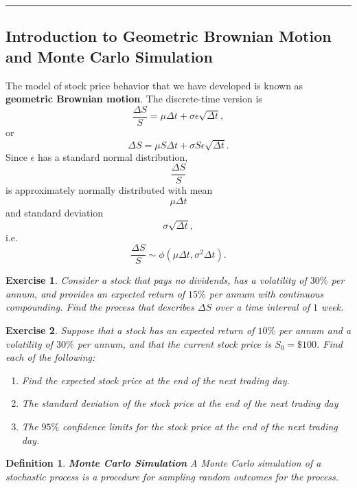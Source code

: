 \documentclass[letterpaper,10pt]{article}
\newtheorem{df}{Definition}[section]
\newtheorem{ex}{Exercise}
\begin{document}
\bigskip

\hrule

\bigskip

\subsection{Introduction to Geometric Brownian Motion and Monte Carlo Simulation}

\noindent The model of stock price behavior that we have developed is known as {\bf geometric Brownian motion}.  The discrete-time version is $$\frac{\Delta S}{S}=\mu\Delta t+\sigma\epsilon\sqrt{\Delta t},$$ or $$\Delta S=\mu S\Delta t+\sigma S\epsilon\sqrt{\Delta t}.$$  Since $\epsilon$ has a standard normal distribution, $$\frac{\Delta S}{S}$$ is approximately normally distributed with mean $$\mu\Delta t$$ and standard deviation $$\sigma\sqrt{\Delta t},$$ i.e. $$\frac{\Delta S}{S}\sim\phi(\mu\Delta t,\sigma^2\Delta t).$$



\begin{ex}
Consider a stock that pays no dividends, has a volatility of $30\%$ per annum, and provides an expected return of $15\%$ per annum with continuous compounding.  Find the process that describes $\Delta S$ over a time interval of $1$ week.
\end{ex}

\begin{ex}
Suppose that a stock has an expected return of $10\%$ per annum and a volatility of $30\%$ per annum, and that the current stock price is $S_0=\$100$.  Find each of the following:

\begin{enumerate}

\item[(a)] Find the expected stock price at the end of the next trading day.

\item[(b)] The standard deviation of the stock price at the end of the next trading day

\item[(c)] The $95\%$ confidence limits for the stock price at the end of the next trading day.

\end{enumerate}

\end{ex}

\begin{df}{\bf Monte Carlo Simulation}
A Monte Carlo simulation of a stochastic process is a procedure for sampling random outcomes for the process. 
\end{df}
\end{document}
